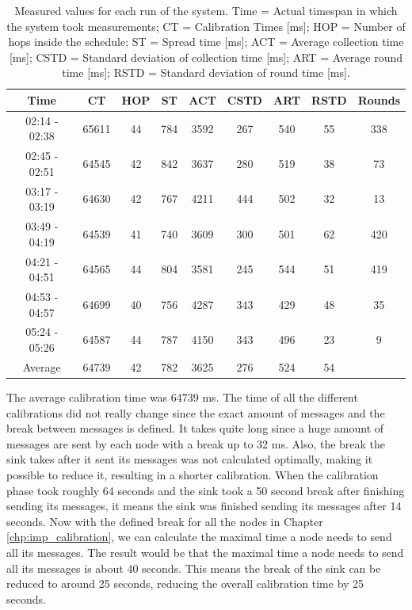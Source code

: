 \begin{table}[htbp]
 \caption{Measured values for each run of the system. Time = Actual timespan in which the system took measurements; CT = Calibration Times [ms]; HOP = Number of hops inside the schedule; ST = Spread time [ms]; ACT = Average collection time [ms]; CSTD = Standard deviation of collection time [ms]; ART = Average round time [ms]; RSTD = Standard deviation of round time [ms].}
 \centering
 \begin{tabular}{c||c|c|c|c|c|c|c|c}
  Time & CT & HOP & ST & ACT & CSTD & ART & RSTD & Rounds\\ \toprule
  02:14 - 02:38 & 65611 & 44 & 784 & 3592 & 267 & 540 & 55 & 338\\
  02:45 - 02:51 & 64545 & 42 & 842 & 3637 & 280 & 519 & 38 & 73\\
  03:17 - 03:19 & 64630 & 42 & 767 & 4211 & 444 & 502 & 32 & 13\\
  03:49 - 04:19 & 64539 & 41 & 740 & 3609 & 300 & 501 & 62 & 420\\
  04:21 - 04:51 & 64565 & 44 & 804 & 3581 & 245 & 544 & 51 & 419\\
  04:53 - 04:57 & 64699 & 40 & 756 & 4287 & 343 & 429 & 48 & 35\\
  05:24 - 05:26 & 64587 & 44 & 787 & 4150 & 343 & 496 & 23 & 9\\ \toprule
  Average & 64739 & 42 & 782 & 3625 & 276 & 524 & 54 & \\
 \end{tabular}
 \label{tab:NightTable}
\end{table}

The average calibration time was 64739 ms. The time of all the different calibrations did not really change since the exact amount of messages and the break between messages is defined. It takes quite long since a huge amount of messages are sent by each node with a break up to 32 ms. Also, the break the sink takes after it sent its messages was not calculated optimally, making it possible to reduce it, resulting in a shorter calibration. When the calibration phase took roughly 64 seconds and the sink took a 50 second break after finishing sending its messages, it means the sink was finished sending its messages after 14 seconds. Now with the defined break for all the nodes in Chapter \ref{chp:imp_calibration}, we can calculate the maximal time a node needs to send all its messages. The result would be that the maximal time a node needs to send all its messages is about 40 seconds. This means the break of the sink can be reduced to around 25 seconds, reducing the overall calibration time by 25 seconds.

